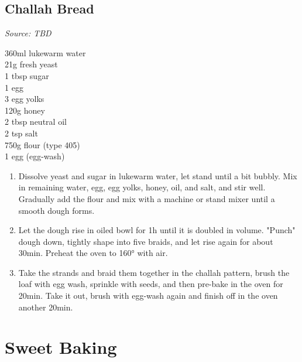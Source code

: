 \documentclass{report}
\begin{document}
\section{Challah Bread}
\textit{Source: TBD}\\
\begin{minipage}[t]{0.21\textwidth} \vspace{0pt}
360ml lukewarm water\\
21g fresh yeast\\
1 tbsp sugar\\
1 egg\\
3 egg yolks\\
120g honey\\
2 tbsp neutral oil\\
2 tsp salt\\
750g flour (type 405)\\
1 egg (egg-wash)
\end{minipage}
\hfill
\begin{minipage}[t]{0.78\textwidth} \vspace{0pt}
	\begin{enumerate}
    	\item Dissolve yeast and sugar in lukewarm water, let stand until a bit bubbly. Mix in remaining water, egg, egg yolks, honey, oil, and salt, and stir well. Gradually add the flour and mix with a machine or stand mixer until a smooth dough forms.
    	\item Let the dough rise in oiled bowl for 1h until it is doubled in volume. "Punch" dough down, tightly shape into five braids, and let rise again for about 30min. Preheat the oven to 160° with air.
    	\item Take the strands and braid them together in the challah pattern, brush the loaf with egg wash, sprinkle with seeds, and then pre-bake in the oven for 20min. Take it out, brush with egg-wash again and finish off in the oven another 20min.
	\end{enumerate}	
\end{minipage}

\chapter{Sweet Baking}
\end{document}
